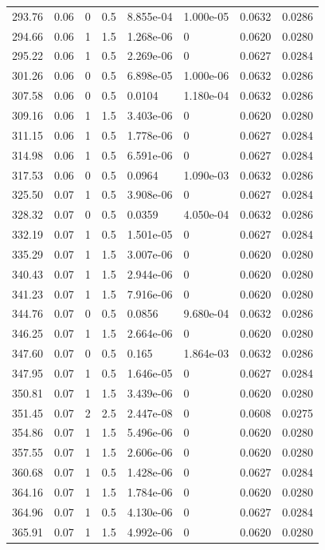 \documentclass[preview]{standalone}
\begin{document}
{{{\begin{tabular}{L{1.2cm}C{1.2cm} C{0.3cm}C{0.5cm} C{1.4cm}C{1.4cm} C{1.4cm}C{1.4cm}}
  293.76  &  0.06  & 0     & 0.5 &  8.855e-04  & 1.000e-05  & 0.0632 &  0.0286   \\ 
  294.66  &  0.06  & 1     & 1.5 &  1.268e-06  & 0  & 0.0620 &  0.0280   \\ 
  295.22  &  0.06  & 1     & 0.5 &  2.269e-06  & 0  & 0.0627 &  0.0284   \\ 
  301.26  &  0.06  & 0     & 0.5 &  6.898e-05  & 1.000e-06  & 0.0632 &  0.0286   \\ 
  307.58  &  0.06  & 0     & 0.5 &  0.0104  & 1.180e-04  & 0.0632 &  0.0286   \\ 
  309.16  &  0.06  & 1     & 1.5 &  3.403e-06  & 0  & 0.0620 &  0.0280   \\ 
  311.15  &  0.06  & 1     & 0.5 &  1.778e-06  & 0  & 0.0627 &  0.0284   \\ 
  314.98  &  0.06  & 1     & 0.5 &  6.591e-06  & 0  & 0.0627 &  0.0284   \\ 
  317.53  &  0.06  & 0     & 0.5 &  0.0964  & 1.090e-03  & 0.0632 &  0.0286   \\ 
  325.50  &  0.07  & 1     & 0.5 &  3.908e-06  & 0  & 0.0627 &  0.0284   \\ 
  328.32  &  0.07  & 0     & 0.5 &  0.0359  & 4.050e-04  & 0.0632 &  0.0286   \\ 
  332.19  &  0.07  & 1     & 0.5 &  1.501e-05  & 0  & 0.0627 &  0.0284   \\ 
  335.29  &  0.07  & 1     & 1.5 &  3.007e-06  & 0  & 0.0620 &  0.0280   \\ 
  340.43  &  0.07  & 1     & 1.5 &  2.944e-06  & 0  & 0.0620 &  0.0280   \\ 
  341.23  &  0.07  & 1     & 1.5 &  7.916e-06  & 0  & 0.0620 &  0.0280   \\ 
  344.76  &  0.07  & 0     & 0.5 &  0.0856  & 9.680e-04  & 0.0632 &  0.0286   \\ 
  346.25  &  0.07  & 1     & 1.5 &  2.664e-06  & 0  & 0.0620 &  0.0280   \\ 
  347.60  &  0.07  & 0     & 0.5 &  0.165  & 1.864e-03  & 0.0632 &  0.0286   \\ 
  347.95  &  0.07  & 1     & 0.5 &  1.646e-05  & 0  & 0.0627 &  0.0284   \\ 
  350.81  &  0.07  & 1     & 1.5 &  3.439e-06  & 0  & 0.0620 &  0.0280   \\ 
  351.45  &  0.07  & 2     & 2.5 &  2.447e-08  & 0  & 0.0608 &  0.0275   \\ 
  354.86  &  0.07  & 1     & 1.5 &  5.496e-06  & 0  & 0.0620 &  0.0280   \\ 
  357.55  &  0.07  & 1     & 1.5 &  2.606e-06  & 0  & 0.0620 &  0.0280   \\ 
  360.68  &  0.07  & 1     & 0.5 &  1.428e-06  & 0  & 0.0627 &  0.0284   \\ 
  364.16  &  0.07  & 1     & 1.5 &  1.784e-06  & 0  & 0.0620 &  0.0280   \\ 
  364.96  &  0.07  & 1     & 0.5 &  4.130e-06  & 0  & 0.0627 &  0.0284   \\ 
  365.91  &  0.07  & 1     & 1.5 &  4.992e-06  & 0  & 0.0620 &  0.0280   \\ 
\hline 
\end{tabular} 

}}}
\end{document}
